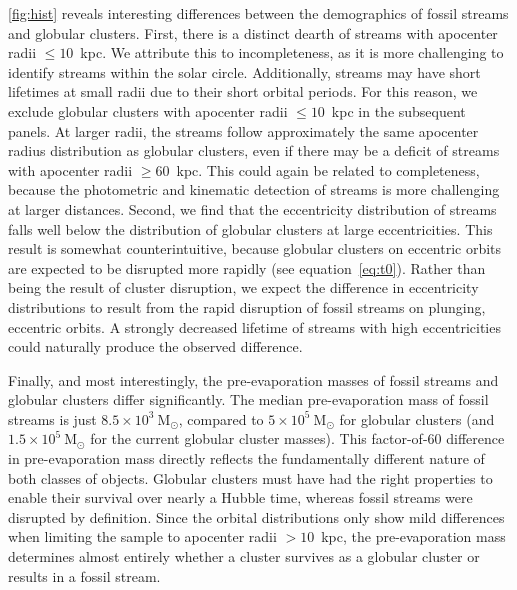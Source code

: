 \documentclass[twocolumn]{aastex63}
\newcommand{\msun}{\ensuremath{\textrm{M}_\odot}}
\begin{document}
\autoref{fig:hist} reveals interesting differences between the demographics of fossil streams and globular clusters.
First, there is a distinct dearth of streams with apocenter radii $\leq10$~kpc.
We attribute this to incompleteness, as it is more challenging to identify streams within the solar circle.
Additionally, streams may have short lifetimes at small radii due to their short orbital periods.
For this reason, we exclude globular clusters with apocenter radii $\leq10$~kpc in the subsequent panels.
At larger radii, the streams follow approximately the same apocenter radius distribution as globular clusters, even if there may be a deficit of streams with apocenter radii $\geq60$~kpc.
This could again be related to completeness, because the photometric and kinematic detection of streams is more challenging at larger distances.
Second, we find that the eccentricity distribution of streams falls well below the distribution of globular clusters at large eccentricities.
This result is somewhat counterintuitive, because globular clusters on eccentric orbits are expected to be disrupted more rapidly (see equation~\ref{eq:t0}).
Rather than being the result of cluster disruption, we expect the difference in eccentricity distributions to result from the rapid disruption of fossil streams on plunging, eccentric orbits.
A strongly decreased lifetime of streams with high eccentricities could naturally produce the observed difference.

Finally, and most interestingly, the pre-evaporation masses of fossil streams and globular clusters differ significantly.
The median pre-evaporation mass of fossil streams is just $8.5\times10^3~\msun$, compared to $5\times10^5~\msun$ for globular clusters (and $1.5\times10^5~\msun$ for the current globular cluster masses).
This factor-of-60 difference in pre-evaporation mass directly reflects the fundamentally different nature of both classes of objects.
Globular clusters must have had the right properties to enable their survival over nearly a Hubble time, whereas fossil streams were disrupted by definition.
Since the orbital distributions only show mild differences when limiting the sample to apocenter radii $>10$~kpc, the pre-evaporation mass determines almost entirely whether a cluster survives as a globular cluster or results in a fossil stream.
\end{document}
